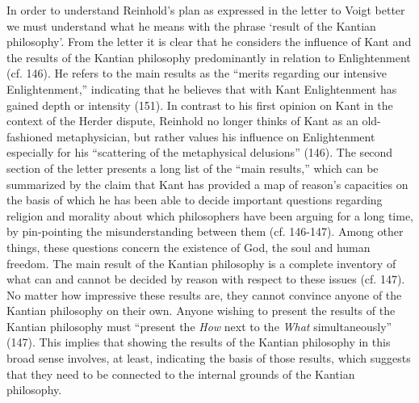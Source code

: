 In order to understand Reinhold's plan as expressed in the letter to Voigt better we must understand what he means with the phrase `result of the Kantian philosophy'. From the letter it is clear that he considers the influence of Kant and the results of the Kantian philosophy predominantly in relation to Enlightenment (cf. 146). He refers to the main results as the ``merits regarding our intensive Enlightenment,'' indicating that he believes that with Kant Enlightenment has gained depth or intensity (151). In contrast to his first opinion on Kant in the context of the Herder dispute, Reinhold no longer thinks of Kant as an old{-}fashioned metaphysician, but rather values his influence on Enlightenment especially for his ``scattering of the metaphysical delusions'' (146). The second section of the letter presents a long list of the ``main results,'' which can be summarized by the claim that Kant has provided a map of reason's capacities on the basis of which he has been able to decide important questions regarding religion and morality about which philosophers have been arguing for a long time, by pin{-}pointing the misunderstanding between them (cf. 146{-}147). Among other things, these questions concern the existence of God, the soul and human freedom. The main result of the Kantian philosophy is a complete inventory of what can and cannot be decided by reason with respect to these issues (cf. 147). No matter how impressive these results are, they cannot convince anyone of the Kantian philosophy on their own. Anyone wishing to present the results of the Kantian philosophy must ``present the \textit{How} next to the \textit{What} simultaneously'' (147). This implies that showing the results of the Kantian philosophy in this broad sense involves, at least, indicating the basis of those results, which suggests that they need to be connected to the internal grounds of the Kantian philosophy. 

